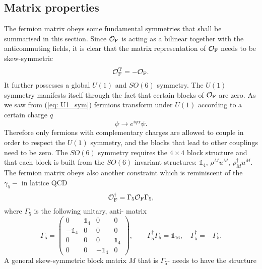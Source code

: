 \subsection{Matrix properties} \label{sec: matrix_prop}
The fermion matrix obeys some fundamental symmetries that shall be summarised in this section. Since $\mathcal{O}_{\rm F}$ is acting as a bilinear together with the anticommuting  fields, it is clear that the matrix representation of $\mathcal{O}_{\rm F}$ needs to be skew-symmetric
%
%
\begin{equation}
\mathcal{O}_{\rm F}^{\rm T} = -\mathcal{O}_{\rm F}.
\label{eq: skew_sym}
\end{equation}
%
%
It further possesses a global $U(1)$ and $SO(6)$ symmetry. The $U(1)$ symmetry manifests itself through the fact that certain blocks of $\mathcal{O}_{\rm F}$ are zero. As we saw from (\ref{eq: U1_sym}) fermions transform under $U(1)$ according to a certain charge $q$
%
%
\begin{equation}
\psi \to e^{iq\alpha}\psi.
\end{equation}
%
%
Therefore only fermions with complementary charges are allowed to couple in order to respect the $U(1)$ symmetry, and the blocks that lead to other couplings need to be zero. The $SO(6)$ symmetry requires the $4\times 4$ block structure and that each block is built from the $SO(6)$ invariant structures: $\mathds{1}_{4},\,\rho^{M}u^{M},\,\rho_{M}^{\dagger}u^{M}$. The fermion matrix obeys also another constraint which is reminiscent of the $\gamma_{5}-$ in lattice QCD \cite{montvay_lattice}
%
%
\begin{equation}
\mathcal{O}_{\rm F}^{\dagger} = \Gamma_{5}\mathcal{O}_{\rm F}\Gamma_{5},
\label{eq: G5_sym}
\end{equation}
%
%
where $\Gamma_{5}$ is the following unitary, anti- matrix
%
%
\begin{equation}
\Gamma_{5} = \begin{pmatrix}
0 & \mathds{1}_{4} & 0 & 0 \\
 -\mathds{1}_{4}& 0 & 0 & 0 \\
0 & 0 & 0 & \mathds{1}_{4} \\
0 & 0 & -\mathds{1}_{4} & 0
\end{pmatrix} ,\qquad
\Gamma_{5}^{\dagger}\Gamma_{5}= \mathds{1}_{16}, \quad \Gamma_{5}^{\dagger} = -\Gamma_{5}.
\end{equation}
%
%
A general skew-symmetric block matrix $M$ that is $\Gamma_{5}$- needs to have the structure
